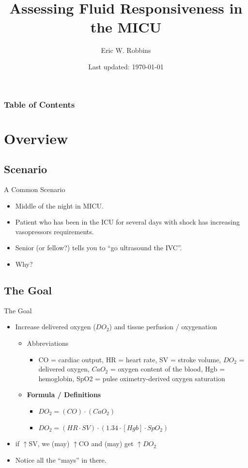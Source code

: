 \documentclass{beamer}
\title{Assessing Fluid Responsiveness in the MICU}
\author{Eric W. Robbins}
\date{Last updated: \today}
\begin{document}
	\begin{frame}
		\maketitle
	\end{frame}
	\begin{frame}
		\frametitle{Table of Contents}
			\begin{multicols}{2}
				\tableofcontents
			\end{multicols}
	\end{frame}
	\section{Overview}
	\subsection{Scenario}
	\begin{frame}{A Common Scenario}
  		\begin{itemize}
  			\item Middle of the night in MICU.
  			\item Patient who has been in the ICU for several days with shock has increasing 	vasopressors requirements.
  			\item Senior (or fellow?) tells you to ``go ultrasound the IVC''.
  			\pause
  			\item Why?
  		\end{itemize}
	\end{frame}
	\subsection{The Goal}
	\begin{frame}{The Goal}
		\begin{itemize}
			\item Increase delivered oxygen ($DO_{2}$) and tissue perfusion / oxygenation
			\pause
				\begin{itemize}
					\item Abbreviations
						\begin{itemize}
							\item CO = cardiac output, HR = heart rate, SV = stroke volume, $DO_{2}$ = delivered oxygen, $CaO_{2}$ = oxygen content of the blood, Hgb = hemoglobin, SpO2 = pulse oximetry-derived oxygen saturation
						\end{itemize}
					\item \textbf{Formula / Definitions}
					\begin{itemize}
						\item $DO_{2}=(CO)\cdot (CaO_{2})$
						\pause
						\item $DO_{2}=(HR\cdot SV)\cdot(1.34\cdot[Hgb]\cdot SpO_{2})$
					\end{itemize}
				\end{itemize}
			\pause
			\item if $\uparrow$SV, we (may) $\uparrow$CO and (may) get $\uparrow$$DO_{2}$
			\item Notice all the ``mays'' in there.
		\end{itemize}
	\end{frame}
\end{document}
